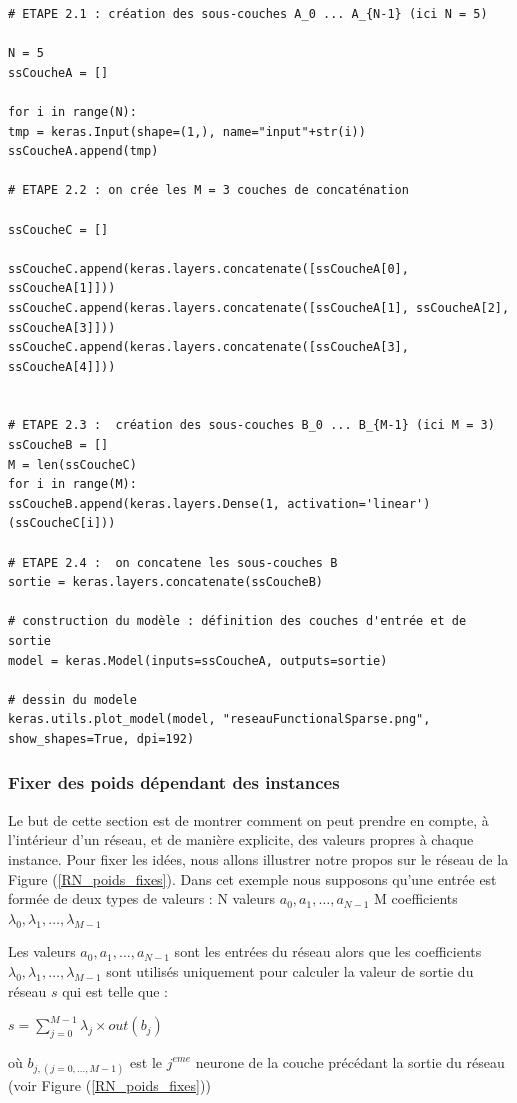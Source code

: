 \begin{itemize}[label=$\square$]
\begin{itemize}
\begin{lstlisting}
# ETAPE 2.1 : création des sous-couches A_0 ... A_{N-1} (ici N = 5)

N = 5
ssCoucheA = []

for i in range(N):
tmp = keras.Input(shape=(1,), name="input"+str(i)) 
ssCoucheA.append(tmp)

# ETAPE 2.2 : on crée les M = 3 couches de concaténation 

ssCoucheC = []

ssCoucheC.append(keras.layers.concatenate([ssCoucheA[0], ssCoucheA[1]]))
ssCoucheC.append(keras.layers.concatenate([ssCoucheA[1], ssCoucheA[2], ssCoucheA[3]]))
ssCoucheC.append(keras.layers.concatenate([ssCoucheA[3], ssCoucheA[4]]))


# ETAPE 2.3 :  création des sous-couches B_0 ... B_{M-1} (ici M = 3)
ssCoucheB = []
M = len(ssCoucheC)
for i in range(M):
ssCoucheB.append(keras.layers.Dense(1, activation='linear')(ssCoucheC[i]))

# ETAPE 2.4 :  on concatene les sous-couches B
sortie = keras.layers.concatenate(ssCoucheB)

# construction du modèle : définition des couches d'entrée et de sortie
model = keras.Model(inputs=ssCoucheA, outputs=sortie)

# dessin du modele
keras.utils.plot_model(model, "reseauFunctionalSparse.png", show_shapes=True, dpi=192)

\end{lstlisting}

\end{itemize}
\end{itemize}

\subsubsection{Fixer des poids dépendant des instances}
Le but de cette section est de montrer comment on peut prendre en compte, à l'intérieur d'un réseau, et de manière explicite, des valeurs propres à chaque instance. 
Pour fixer les idées, nous allons illustrer notre propos sur le réseau de la 
Figure (\ref{RN_poids_fixes}). Dans cet exemple nous supposons qu'une entrée est formée de deux types de valeurs : 
N valeurs $a_0, a_1, \dots, a_{N-1}$  
M coefficients $\lambda_0,\lambda_1, \dots ,\lambda_{M-1}$

Les valeurs $a_0, a_1, \dots, a_{N-1}$  sont les entrées du réseau alors que les coefficients $\lambda_0,\lambda_1, \dots,\lambda_{M-1}$ sont utilisés uniquement pour calculer la valeur de sortie du réseau $s$ qui est telle que :
\begin{center}
$s=\sum_{j=0}^{M-1} \lambda_j \times out(b_j)$
\end{center}
où $b_{j,(j=0, \dots, M-1)}$ est le $j^{eme}$  neurone de la couche précédant la sortie du réseau (voir 
Figure (\ref{RN_poids_fixes}))

